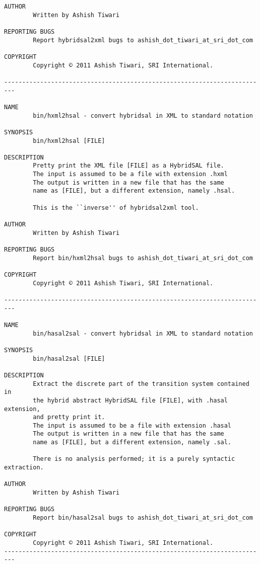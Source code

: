 \documentclass{llncs}
\begin{document}
\begin{verbatim}
AUTHOR
        Written by Ashish Tiwari

REPORTING BUGS
        Report hybridsal2xml bugs to ashish_dot_tiwari_at_sri_dot_com

COPYRIGHT
        Copyright © 2011 Ashish Tiwari, SRI International.

-------------------------------------------------------------------------

NAME
        bin/hxml2hsal - convert hybridsal in XML to standard notation

SYNOPSIS
        bin/hxml2hsal [FILE]

DESCRIPTION
        Pretty print the XML file [FILE] as a HybridSAL file.
        The input is assumed to be a file with extension .hxml
        The output is written in a new file that has the same
        name as [FILE], but a different extension, namely .hsal.

        This is the ``inverse'' of hybridsal2xml tool.

AUTHOR
        Written by Ashish Tiwari

REPORTING BUGS
        Report bin/hxml2hsal bugs to ashish_dot_tiwari_at_sri_dot_com

COPYRIGHT
        Copyright © 2011 Ashish Tiwari, SRI International.

-------------------------------------------------------------------------

NAME
        bin/hasal2sal - convert hybridsal in XML to standard notation

SYNOPSIS
        bin/hasal2sal [FILE]

DESCRIPTION
        Extract the discrete part of the transition system contained in
        the hybrid abstract HybridSAL file [FILE], with .hasal extension, 
        and pretty print it.
        The input is assumed to be a file with extension .hasal
        The output is written in a new file that has the same
        name as [FILE], but a different extension, namely .sal.

        There is no analysis performed; it is a purely syntactic extraction.

AUTHOR
        Written by Ashish Tiwari

REPORTING BUGS
        Report bin/hasal2sal bugs to ashish_dot_tiwari_at_sri_dot_com

COPYRIGHT
        Copyright © 2011 Ashish Tiwari, SRI International.
-------------------------------------------------------------------------
\end{verbatim}
\end{document}
